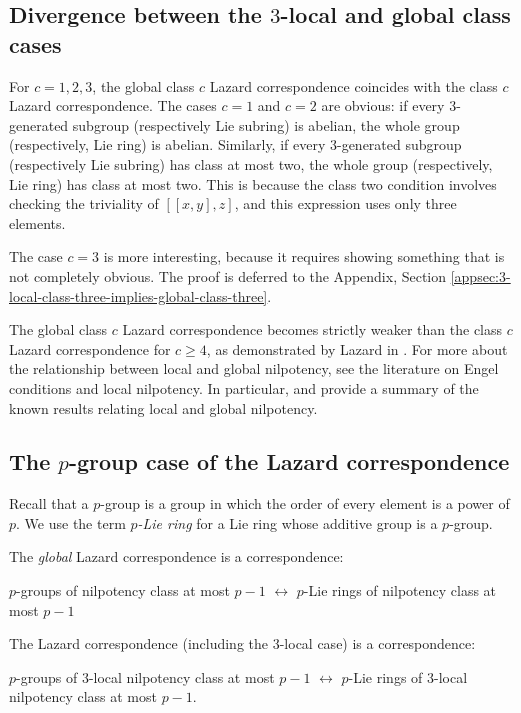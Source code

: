 \documentclass{ucetd}
\begin{document}
\subsection{Divergence between the $3$-local and global class cases}

For $c = 1,2,3$, the global class $c$ Lazard correspondence coincides
with the class $c$ Lazard correspondence. The cases $c = 1$ and $c =
2$ are obvious: if every $3$-generated subgroup (respectively Lie
subring) is abelian, the whole group (respectively, Lie ring) is
abelian. Similarly, if every $3$-generated subgroup (respectively Lie
subring) has class at most two, the whole group (respectively, Lie
ring) has class at most two. This is because the class two condition
involves checking the triviality of $[[x,y],z]$, and this expression
uses only three elements.

The case $c = 3$ is more interesting, because it requires showing
something that is not completely obvious. The proof is deferred to the
Appendix, Section
\ref{appsec:3-local-class-three-implies-global-class-three}.

The global class $c$ Lazard correspondence becomes strictly weaker
than the class $c$ Lazard correspondence for $c \ge 4$, as
demonstrated by Lazard in \cite{Lazardsoriginal}. For more about the
relationship between local and global nilpotency, see the literature
on Engel conditions and local nilpotency. In particular,
\cite{Pilgrim} and \cite{Plotkin} provide a summary of the known
results relating local and global nilpotency.

\subsection{The $p$-group case of the Lazard correspondence}

Recall that a $p$-group is a group in which the order of every element is
a power of $p$. We use the term {\em $p$-Lie ring} for a Lie ring
whose additive group is a $p$-group.

The {\em global} Lazard correspondence is a correspondence:

$p$-groups of nilpotency class at most $p - 1$ $\leftrightarrow$
$p$-Lie rings of nilpotency class at most $p - 1$

The Lazard correspondence (including the $3$-local case) is a
correspondence:

$p$-groups of $3$-local nilpotency class at most $p - 1$
$\leftrightarrow$ $p$-Lie rings of $3$-local nilpotency class at most
$p - 1$.
\end{document}
